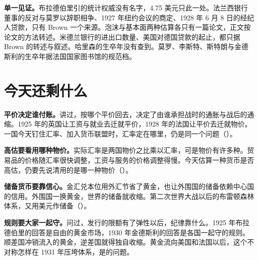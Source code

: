 \begin{deeper}[史料说明]
\textbf{单一见证。}布拉德伯里引的统计权威没有名字，4.75 美元只此一处。法兰西银行董事的反对与莫罗以辞职相争、1927 年纽约会议的商定、1928 年 6 月 8 日的经纪人贷款，只有 Brown 一个来源。泡沫与基本面两种估算各只有一篇论文，正文按论文的方法转述。米德兰银行的进出口数量、美国对德国贷款的起止，都只据 Brown 的转述与叙述。哈里森的生卒年没有查到。莫罗、李斯特、斯特朗与金德斯利的生卒年据法国国家图书馆的规范档。
\end{deeper}

\section{今天还剩什么}\label{sec:interwar-legacy}

\textbf{平价决定谁付账。}讲过，按哪个平价回去，决定了由谁承担战时的通胀与战后的通缩。1925 年的英国让工资与就业去迁就平价，1928 年的法国让平价去迁就物价。一国今天钉住汇率、加入货币联盟时，汇率定在哪里，仍是同一个问题（）。

\textbf{高估要看用哪种物价。}实际汇率是两国物价之比乘以汇率，可是物价有许多种。贸易品的价格随汇率很快调整，工资与服务的价格调整得慢。今天估算一种货币是否高估，仍要先说清用的是哪一种物价（）。

\textbf{储备货币要靠信心。}金汇兑本位用外汇节省了黄金，也让外围国的储备依赖中心国的信用。外围国一换黄金，世界的储备就收缩。第二次世界大战以后的布雷顿森林体系，又用美元作储备（）。

\textbf{规则要大家一起守。}问过，发行的限额有了弹性以后，纪律靠什么。1925 年布拉德伯里的回答是自由的黄金市场，1930 年金德斯利的回答是各国一起守的规则。顺差国冲销流入的黄金，逆差国就得独自收缩。黄金流向美国和法国以后，这个不对称怎样在 1931 年压垮体系，是的问题。

